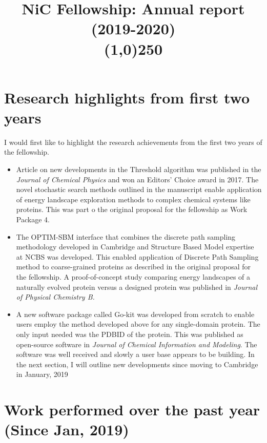 \documentclass[a4paper,11pt]{article}
\title{ \vspace{-9ex}NiC Fellowship: Annual report (2019-2020)\\\line(1,0){250}}
\date{\vspace{-11ex}}
\begin{document}
\maketitle
\section{Research highlights from first two years}
I would first like to highlight the research achievements from the  first two years of the fellowship. 
\begin{itemize}
    \item {Article on new developments in the Threshold algorithm was published in the \textit{Journal of Chemical Physics} and won an Editors' Choice award in 2017. The novel stochastic search methods outlined in the manuscript enable application of energy landscape exploration methods to complex chemical systems like proteins. This was part o the original proposal for the fellowship as Work Package 4.} 
    \item{The OPTIM-SBM interface that combines the discrete path sampling methodology developed in Cambridge and Structure Based Model expertise at NCBS was developed.  This enabled application of Discrete Path Sampling method to coarse-grained proteins as described in the original proposal for the fellowship. A proof-of-concept study comparing energy landscapes of a naturally evolved protein versus a designed protein was published in \textit{Journal of  Physical Chemistry B.}}
    \item{A new software package called Go-kit was developed from scratch to enable users employ the method developed above for any single-domain protein. The only input needed was the PDBID of the protein. This was published as open-source software in \textit{Journal of Chemical Information and Modeling}. The software was well received and slowly a user base appears to be building.}
    In the next section, I will outline new developments since moving to Cambridge in January, 2019

\end{itemize}
\section{Work performed over the past year (Since Jan, 2019)}
\end{document}
